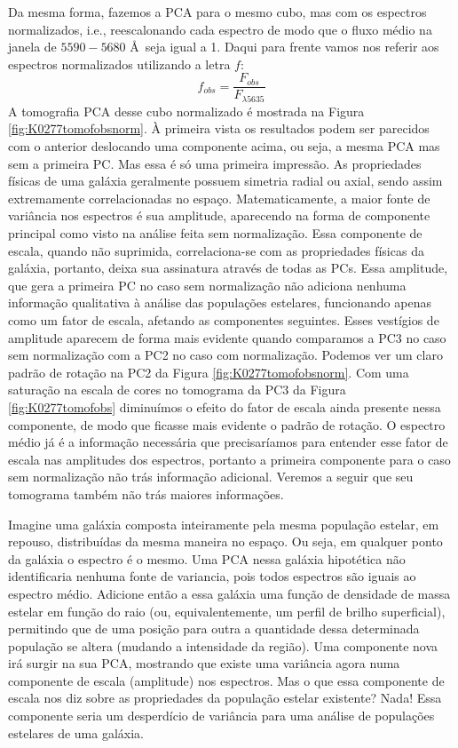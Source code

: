 Da mesma forma, fazemos a PCA para o mesmo cubo, mas com os espectros normalizados, i.e., reescalonando cada espectro de
modo que o fluxo médio na janela de $5590-5680$ \AA\ seja igual a 1. Daqui para frente vamos nos referir aos espectros
normalizados utilizando a letra $f$:
\begin{equation}
f_{obs} = \dfrac{F_{obs}}{F_{\lambda5635}}
\end{equation} 
\noindent A tomografia PCA desse cubo normalizado é mostrada na Figura \ref{fig:K0277tomofobsnorm}. À primeira vista os
resultados podem ser parecidos com o anterior deslocando uma componente acima, ou seja, a mesma PCA mas sem a primeira
PC. Mas essa é só uma primeira impressão. As propriedades físicas de uma galáxia geralmente possuem simetria radial ou
axial, sendo assim extremamente correlacionadas no espaço. Matematicamente, a maior fonte de variância nos espectros é
sua amplitude, aparecendo na forma de componente principal como visto na análise feita sem normalização. Essa componente
de escala, quando não suprimida, correlaciona-se com as propriedades físicas da galáxia, portanto, deixa sua assinatura
através de todas as PCs. Essa amplitude, que gera a primeira PC no caso sem normalização não adiciona nenhuma informação
qualitativa à análise das populações estelares, funcionando apenas como um fator de escala, afetando as componentes
seguintes. Esses vestígios de amplitude aparecem de forma mais evidente quando comparamos a PC3 no caso sem normalização
com a PC2 no caso com normalização. Podemos ver um claro padrão de rotação na PC2 da Figura \ref{fig:K0277tomofobsnorm}.
Com uma saturação na escala de cores no tomograma da PC3 da Figura \ref{fig:K0277tomofobs} diminuímos o efeito do fator
de escala ainda presente nessa componente, de modo que ficasse mais evidente o padrão de rotação. O espectro médio já é
a informação necessária que precisaríamos para entender esse fator de escala nas amplitudes dos espectros, portanto a
primeira componente para o caso sem normalização não trás informação adicional. Veremos a seguir que seu tomograma
também não trás maiores informações.

Imagine uma galáxia composta inteiramente pela mesma população estelar, em repouso, distribuídas da mesma maneira no
espaço. Ou seja, em qualquer ponto da galáxia o espectro é o mesmo. Uma PCA nessa galáxia hipotética não identificaria
nenhuma fonte de variancia, pois todos espectros são iguais ao espectro médio. Adicione então a essa galáxia uma função
de densidade de massa estelar em função do raio (ou, equivalentemente, um perfil de brilho superficial), permitindo que
de uma posição para outra a quantidade dessa determinada população se altera (mudando a intensidade da região). Uma
componente nova irá surgir na sua PCA, mostrando que existe uma variância agora numa componente de escala (amplitude)
nos espectros. Mas o que essa componente de escala nos diz sobre as propriedades da população estelar existente? Nada!
Essa componente seria um desperdício de variância para uma análise de populações estelares de uma galáxia.

